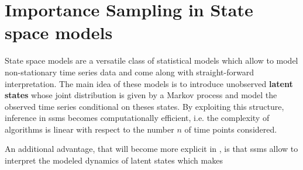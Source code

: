 \glsresetall
\newcommand{\ce}{{\ensuremath{\text{CE}}}}
\newcommand{\pce}{{\ensuremath{\psi_{\text{CE}}}}}
\newcommand{\hpce}{{\ensuremath{\hat\psi_{\text{CE}}}}}

\newcommand{\eis}{{\ensuremath{\text{EIS}}}}
\newcommand{\peis}{{\ensuremath{\psi_{\text{EIS}}}}}
\newcommand{\hpeis}{{\ensuremath{\hat\psi_{\text{EIS}}}}}

\newcommand{\la}{{\ensuremath{\text{LA}}}}

\newcommand{\Dto}{\stackrel{\mathcal D}{\to}}
\newcommand{\id}{\operatorname{id}}


\newcommand{\nbinom}{\operatorname{NegBinom}}

\chapter{Importance Sampling in State space models}
\label{cha:state_space_models}

State space models are a versatile class of statistical models which allow to model non-stationary time series data and come along with straight-forward interpretation.
The main idea of these models is to introduce unobserved \textbf{latent states} whose joint distribution is given by a Markov process and model the observed time series conditional on theses states.
By exploiting this structure, inference in \glspl{ssm} becomes computationally efficient, i.e. the complexity of algorithms is linear with respect to the number $n$ of time points considered.

An additional advantage, that will become more explicit in , is that \glspl{ssm} allow to interpret the modeled dynamics of latent states which makes


